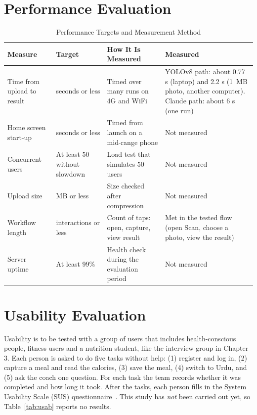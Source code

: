 \section{Performance Evaluation}
\begin{table}[H]
\centering
\caption{Performance Targets and Measurement Method}
\label{tab:perf}
\small
\begin{tabularx}{\textwidth}{|>{\raggedright\arraybackslash}p{3.3cm}|>{\raggedright\arraybackslash}p{2.6cm}|>{\raggedright\arraybackslash}X|>{\raggedright\arraybackslash}p{3.1cm}|}
\hline
\textbf{Measure} & \textbf{Target} & \textbf{How It Is Measured} & \textbf{Measured} \\ \hline
Time from upload to result & 3 seconds or less & Timed over many runs on 4G and WiFi & YOLOv8 path: about 0.77 s (laptop) and 2.2 s (1~MB photo, another computer). Claude path: about 6 s (one run) \\ \hline
Home screen start-up & 2 seconds or less & Timed from launch on a mid-range phone & Not measured \\ \hline
Concurrent users & At least 50 without slowdown & Load test that simulates 50 users & Not measured \\ \hline
Upload size & 1 MB or less & Size checked after compression & Not measured \\ \hline
Workflow length & 3 interactions or less & Count of taps: open, capture, view result & Met in the tested flow (open Scan, choose a photo, view the result) \\ \hline
Server uptime & At least 99\% & Health check during the evaluation period & Not measured \\ \hline
\end{tabularx}
\end{table}

\section{Usability Evaluation}
Usability is to be tested with a group of users that includes health-conscious people, fitness users and a nutrition
student, like the interview group in Chapter 3. Each person is asked to do five tasks without help: (1) register and
log in, (2) capture a meal and read the calories, (3) save the meal, (4) switch to Urdu, and (5) ask the coach one
question. For each task the team records whether it was completed and how long it took. After the tasks, each person
fills in the System Usability Scale (SUS) questionnaire~\cite{sus}. This study has \emph{not} been carried out yet, so
Table~\ref{tab:usab} reports no results.

